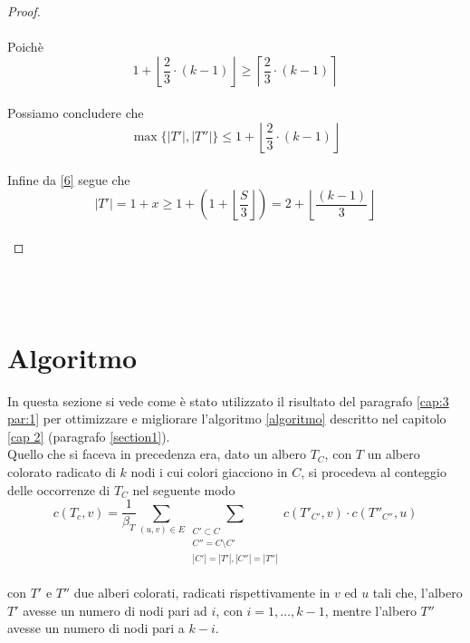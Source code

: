 \begin{proof}
\begin{equation}
\end{equation}
\\
Poich\`e
\\
\[1 + \left\lfloor \frac{2}{3} \cdot (k-1) \right\rfloor \ge \left\lceil \frac{2}{3} \cdot (k-1) \right\rceil \] 
\\
Possiamo concludere che
\\
\[ \max\{|T'|,|T''|\} \le 1 + \left\lfloor \frac{2}{3} \cdot (k-1) \right\rfloor \]
\\
Infine da \eqref{6} segue che
\\
\[ |T'| = 1+ x \ge 1+ (1 +  \left\lfloor \frac{S}{3}\right\rfloor ) = 2 +  \left\lfloor \frac{(k-1)}{3}\right\rfloor\]
\\ 	 
\end{proof}\mbox{}\\\\
 
 	
\section{Algoritmo}
\label{cap:3 par:2}
In questa sezione si vede come \`e stato utilizzato il risultato del paragrafo \ref{cap:3 par:1} per ottimizzare e migliorare l'algoritmo \ref{algoritmo} descritto nel capitolo \ref{cap 2} (paragrafo \ref{section1}).\\
Quello che si faceva in precedenza era, dato un albero $ T_C $, con $ T $ un albero colorato radicato di $ k $ nodi i cui colori giacciono in $ C $, si procedeva al conteggio delle occorrenze di $ T_C $ nel seguente modo
\[	c(T_c,v)=\frac{1}{\beta_T}\sum_{(u,v)\in E}\sum_{\substack{C' \subset C \\C'' = C \setminus C' \\ |C'|=|T'|, |C''| = |T''|}}c(T'_{C'},v)\cdot c(T''_{C''},u) \]\\
con $ T' $ e $ T'' $ due alberi colorati, radicati rispettivamente in $ v $ ed $ u $ tali che, l'albero $ T' $ avesse un numero di nodi pari ad $ i $, con $ i = 1, \dots , k-1 $, mentre l'albero $ T'' $ avesse un numero di nodi pari a $ k-i $.

